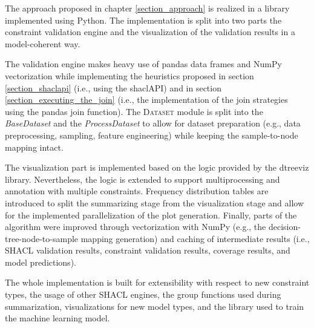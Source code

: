 The approach proposed in chapter \ref{section_approach} is realized in a library implemented using Python. The implementation is split into two parts the constraint validation engine and the visualization of the validation results in a model-coherent way.

The validation engine makes heavy use of pandas data frames and NumPy vectorization while implementing the heuristics proposed in section \ref{section_shaclapi} (i.e., using the shaclAPI) and in section \ref{section_executing_the_join} (i.e., the implementation of the join strategies using the pandas join function). The \textsc{Dataset} module is split into the \emph{BaseDataset} and the \emph{ProcessDataset} to allow for dataset preparation (e.g., data preprocessing, sampling, feature engineering) while keeping the sample-to-node mapping intact. 

The visualization part is implemented based on the logic provided by the dtreeviz library. Nevertheless, the logic is extended to support multiprocessing and annotation with multiple constraints. Frequency distribution tables are introduced to split the summarizing stage from the visualization stage and allow for the implemented parallelization of the plot generation. Finally, parts of the algorithm were improved through vectorization with NumPy (e.g., the decision-tree-node-to-sample mapping generation) and caching of intermediate results (i.e., SHACL validation results, constraint validation results, coverage results, and model predictions).

The whole implementation is built for extensibility with respect to new constraint types, the usage of other SHACL engines, the group functions used during summarization, visualizations for new model types, and the library used to train the machine learning model.